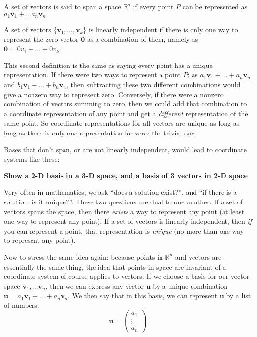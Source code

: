 \documentclass[../master.tex]{subfiles}
\begin{document}
	\begin{defn}
		A set of vectors is said to span a space $\mathbb{R}^n$ if every point $P$ can be represented as $a_1 \mathbf v_1 + \dots a_n \mathbf v_n$
	\end{defn}
	
	\begin{defn}
		A set of vectors $\{\mathbf v_1, \dots , \mathbf v_k \}$ is linearly independent if there is only one way to represent the zero vector $\mathbf 0$ as a combination of them, namely as $\mathbf 0 = 0v_1 + \dots + 0 v_k$.
	\end{defn}
	
	This second definition is the same as saying every point has a unique representation. If there were two ways to represent a point $P$: as $a_1 \mathbf v_1 + \dots + a_n \mathbf v_n$ and $b_1 \mathbf v_1 + \dots + b_n \mathbf v_n$, then subtracting these two different combinations would give a nonzero way to represent zero. Conversely, if there were a nonzero combination of vectors summing to zero, then we could add that combination to a coordinate representation of any point and get a \emph{different} representation of the same point. So coordinate representations for all vectors are unique as long as long as there is only one representation for zero: the trivial one.
	
	Bases that don't span, or are not linearly independent, would lead to coordinate systems like these:
	
	\textbf{Show a 2-D basis in a 3-D space, and a basis of 3 vectors in 2-D space}

	Very often in mathematics, we ask ``does a solution exist?'', and ``if there is a solution, is it unique?''. These two questions are dual to one another. If a set of vectors spans the space, then there \emph{exists} a way to represent any point (at least one way to represent any point). If a set of vectors is linearly independent, then \emph{if} you can represent a point, that representation is \emph{unique} (no more than one way to represent any point).
	
	Now to stress the same idea again: because points in $\mathbb R^n$ and vectors are essentially the same thing, the idea that points in space are invariant of a coordinate system of course applies to vectors. If we choose a basis for our vector space $\mathbf v_1, \dots \mathbf v_n$, then we can express any vector $\mathbf u$ by a unique combination $\mathbf u = a_1 \mathbf v_1 + \dots + a_n \mathbf v_n$. We then say that in this basis, we can represent $\mathbf u$ by a list of numbers:
	\begin{equation*}
		\mathbf u = \begin{pmatrix} a_1 \\ \vdots \\a_n	\end{pmatrix}
	\end{equation*}
	
\end{document}
